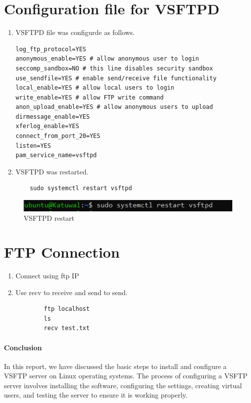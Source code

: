 \documentclass[12pt]{article}
\begin{document}
\section{Configuration file for VSFTPD}
\begin{enumerate}
    \item VSFTPD file was configurde as follows.
    \begin{verbatim}
log_ftp_protocol=YES
anonymous_enable=YES # allow anonymous user to login
seccomp_sandbox=NO # this line disables security sandbox
use_sendfile=YES # enable send/receive file functionality
local_enable=YES # allow local users to login
write_enable=YES # allow FTP write command
anon_upload_enable=YES # allow anonymous users to upload
dirmessage_enable=YES
xferlog_enable=YES
connect_from_port_20=YES
listen=YES
pam_service_name=vsftpd

    \end{verbatim}
    \item VSFTPD was restarted.
    \begin{verbatim}
    sudo systemctl restart vsftpd
    \end{verbatim}
\end{enumerate}
\begin{figure}[h!]
    \centering
    \includegraphics{Images/restart.PNG}
    \caption{VSFTPD restart}
\end{figure}
\section{FTP Connection}
\begin{enumerate}
    \item Connect using ftp IP
    \item Use recv to receive and send to send.
    \begin{verbatim}
        ftp localhost
        ls
        recv test.txt
    \end{verbatim}
\end{enumerate}
\paragraph{Conclusion\\}
In this report, we have discussed the basic steps to install and 
configure a VSFTP server on Linux operating systems. 
The process of configuring a VSFTP server involves installing the 
software, configuring the settings, creating virtual users, and 
testing the server to ensure it is working properly.
\end{document}
